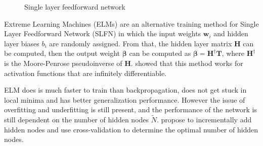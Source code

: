 \begin{figure}[htpb]
    \caption{Single layer feedforward network}%
\end{figure}

Extreme Learning Machines (ELMs) are an alternative training method for Single
Layer Feedforward Network (SLFN) in which the input weights $\textbf{w}_i$ and
hidden layer biases $b_i$ are randomly assigned. From that, the hidden layer matrix $\textbf{H}$
can be computed, then the output weight $\boldsymbol\beta$ can be computed as $\boldsymbol\beta =
\textbf{H}^{\dagger} \textbf{T}$, where $\textbf{H}^{\dagger}$ is the Moore-Penrose pseudoinverse
of $\textbf{H}$.
\Textcite{huangExtremeLearningMachine2006} showed that
this method works for activation functions that are infinitely differentiable.

ELM does is much faster to train than backpropagation, does not get stuck in local minima
and has better generalization performance. However the issue of overfitting and underfitting
is still present, and the performance of the network is still dependent on the number of
hidden nodes $\tilde{N}$. \Textcite{huangExtremeLearningMachine2012} propose to incrementally
add hidden nodes and use cross-validation to determine the optimal number of hidden nodes.

